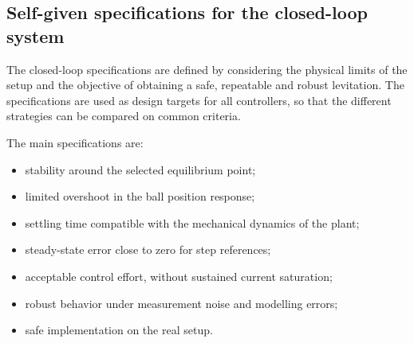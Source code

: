 \subsection{Self-given specifications for the closed-loop system}

The closed-loop specifications are defined by considering the physical limits of the setup and the objective of obtaining a safe, repeatable and robust levitation. The specifications are used as design targets for all controllers, so that the different strategies can be compared on common criteria.

The main specifications are:
\begin{itemize}[leftmargin=1.2cm]
    \item stability around the selected equilibrium point;
    \item limited overshoot in the ball position response;
    \item settling time compatible with the mechanical dynamics of the plant;
    \item steady-state error close to zero for step references;
    \item acceptable control effort, without sustained current saturation;
    \item robust behavior under measurement noise and modelling errors;
    \item safe implementation on the real setup.
\end{itemize}
